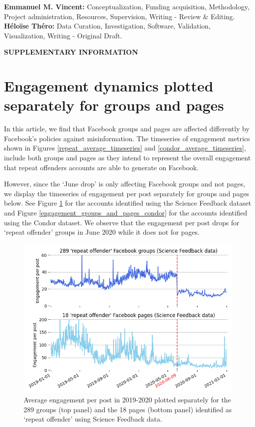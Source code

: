 \documentclass[review]{elsarticle}
\newcommand{\beginsupplement}{%
        \setcounter{table}{0}
        \renewcommand{\thetable}{S\arabic{table}}%
        \setcounter{figure}{0}
        \renewcommand{\thefigure}{S\arabic{figure}}%
     }
\begin{document}
{{\textbf{Emmanuel M. Vincent:} Conceptualization, Funding acquisition, Methodology, Project administration, Resources, Supervision, Writing - Review \& Editing.
\textbf{Héloïse Théro:} Data Curation, Investigation, Software, Validation, Visualization, Writing - Original Draft.



\newpage

\beginsupplement

\textbf{SUPPLEMENTARY INFORMATION}

\section*{Engagement dynamics plotted separately for groups and pages}

In this article, we find that Facebook groups and pages are affected differently by Facebook’s policies against misinformation.
The timeseries of engagement metrics shown in Figures \ref{repeat_average_timeseries} and \ref{condor_average_timeseries}, include both groups and pages as they intend to represent the overall engagement that repeat offenders accounts are able to generate on Facebook.

However, since the `June drop’ is only affecting Facebook groups and not pages, we display the timeseries of engagement per post separately for groups and pages below. See Figure \ref{engagement_groups_and_pages_sf} for the accounts identified using the Science Feedback dataset and Figure \ref{engagement_groups_and_pages_condor} for the accounts identified using the Condor dataset. 
We observe that the engagement per post drops for `repeat offender' groups in June 2020 while it does not for pages.

\begin{figure}[!h]
\centering
\includegraphics[scale=0.5]{./../figure/supplementary_engagement_groups_and_pages_sf.png}
\caption{
Average engagement per post in 2019-2020 plotted separately for the 289 groups (top panel) and the 18 pages (bottom panel) identified as `repeat offender' using Science Feedback data.
}
\label{engagement_groups_and_pages_sf}
\end{figure}

}}
\end{document}
